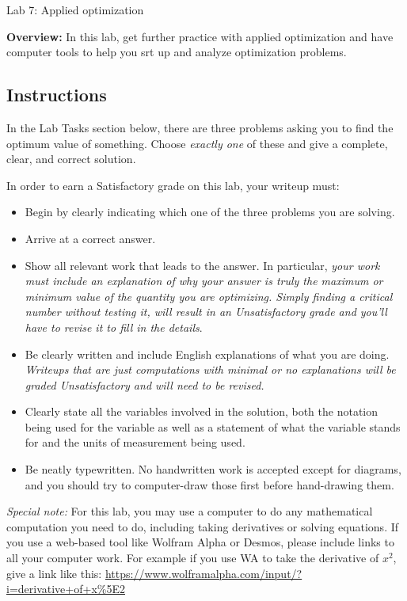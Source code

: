 \documentclass[11pt,letterpaper]{article}
\begin{document}
\begin{flushright}
	\begin{Large}
		Lab 7: Applied optimization
	\end{Large}
\end{flushright}

\noindent
\textbf{Overview:} In this lab, get further practice with applied optimization and have computer tools to help you srt up and analyze optimization problems. 



\subsection*{Instructions}

In the Lab Tasks section below, there are three problems asking you to find the optimum value of something. Choose \emph{exactly one} of these and give a complete, clear, and correct solution. 

In order to earn a Satisfactory grade on this lab, your writeup must: 
\begin{itemize}
    \item Begin by clearly indicating which one of the three problems you are solving. 
    \item Arrive at a correct answer. 
    \item Show all relevant work that leads to the answer. In particular, \emph{your work must include an explanation of why your answer is truly the maximum or minimum value of the quantity you are optimizing. Simply finding a critical number without testing it, will result in an Unsatisfactory grade and you'll have to revise it to fill in the details}. 
    \item Be clearly written and include English explanations of what you are doing. \emph{Writeups that are just computations with minimal or no explanations will be graded Unsatisfactory and will need to be revised.} 
    \item Clearly state all the variables involved in the solution, both the notation being used for the variable as well as a statement of what the variable stands for and the units of measurement being used. 
    \item Be neatly typewritten. No handwritten work is accepted except for diagrams, and you should try to computer-draw those first before hand-drawing them. 
\end{itemize}

\emph{Special note:} For this lab, you may use a computer to do any mathematical computation you need to do, including taking derivatives or solving equations. If you use a web-based tool like Wolfram Alpha or Desmos, please include links to all your computer work. For example if you use WA to take the derivative of $x^2$, give a link like this: \url{https://www.wolframalpha.com/input/?i=derivative+of+x%5E2} 
\end{document}
